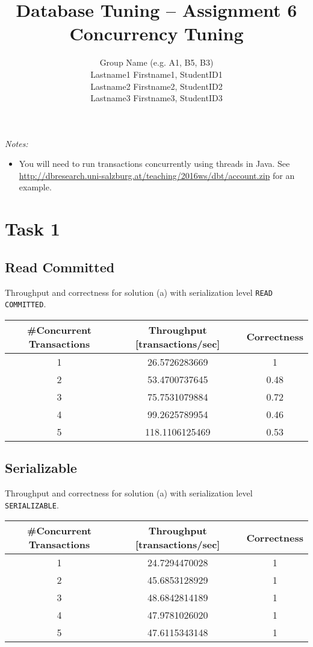 \documentclass[11pt]{scrartcl}
\title{
  \textbf{\large Database Tuning -- Assignment 6}\\
  Concurrency Tuning
}
\author{
 Group Name (e.g. A1, B5, B3)\\
 \large Lastname1 Firstname1, StudentID1 \\
 \large Lastname2 Firstname2, StudentID2 \\
 \large Lastname3 Firstname3, StudentID3 
}
\begin{document}
\maketitle

\noindent
{\it Notes:}

\begin{itemize}
\item You will need to run transactions concurrently using threads in
  Java. See\\ \url{http://dbresearch.uni-salzburg.at/teaching/2016ws/dbt/account.zip}
  for an example.
\end{itemize}

\section*{Task 1}

\subsection*{Read Committed}

Throughput and correctness for solution (a) with serialization level
{\tt\small READ COMMITTED}.

\bigskip

\begin{tabular}{c|c|c}
  \#Concurrent Transactions & Throughput [transactions/sec] & Correctness
  \\\hline
  1 & 26.5726283669 & 1\\
  2 & 53.4700737645 & 0.48\\
  3 & 75.7531079884 & 0.72\\
  4 & 99.2625789954 & 0.46\\
  5 & 118.1106125469 & 0.53\\    
\end{tabular}

\medskip

\subsection*{Serializable}

Throughput and correctness for solution (a) with serialization level
{\tt\small SERIALIZABLE}.

\bigskip

\begin{tabular}{c|c|c}
  \#Concurrent Transactions & Throughput [transactions/sec] & Correctness
  \\\hline
  1 & 24.7294470028 & 1\\
  2 & 45.6853128929 & 1\\
  3 & 48.6842814189 & 1\\
  4 & 47.9781026020 & 1\\
  5 & 47.6115343148 & 1\\    
\end{tabular}
\end{document}

